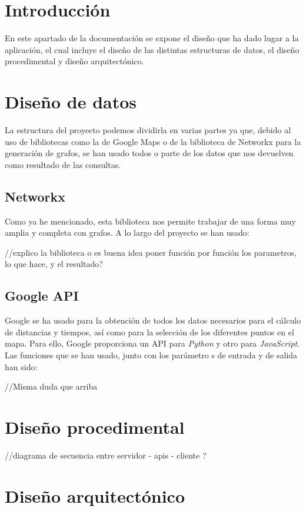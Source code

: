 
\section{Introducción}
En este apartado de la documentación se expone el diseño que ha dado lugar a la aplicación, el cual incluye el diseño de las distintas estructuras de datos, el diseño procedimental y diseño arquitectónico.
\section{Diseño de datos}
La estructura del proyecto podemos dividirla en varias partes ya que, debido al uso de bibliotecas como la de Google Maps o de la biblioteca de Networkx para la generación de grafos, se han usado todos o parte de los datos que nos devuelven como resultado de las consultas.

\subsection{Networkx}
Como ya he mencionado, esta biblioteca nos permite trabajar de una forma muy amplia y completa con grafos. A lo largo del proyecto se han usado:

//explico la biblioteca o es buena idea poner función por función los parametros, lo que hace, y el resultado?


\subsection{Google API}
Google se ha usado para la obtención de todos los datos necesarios para el cálculo de distancias y tiempos, así como para la selección de los diferentes puntos en el mapa. Para ello, Google proporciona un API para \textit{Python} y otro para \textit{JavaScript}. Las funciones que se han usado, junto con los parámetro s de entrada y de salida han sido:

//Misma duda que arriba 


\section{Diseño procedimental}

//diagrama de secuencia entre servidor - apis - cliente ?

\section{Diseño arquitectónico}


